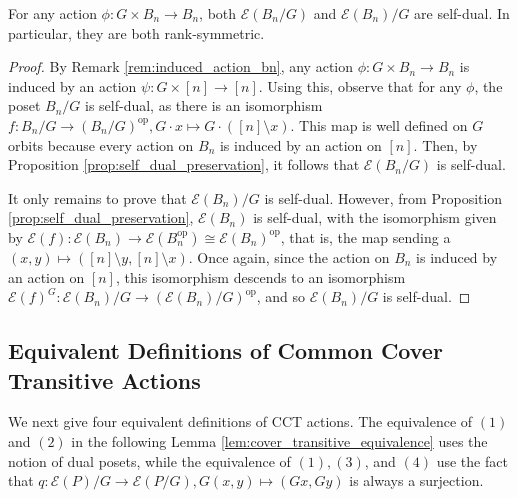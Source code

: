 \documentclass[smallextended, envcountsame, numbook]{svjour3}
\numberwithin{equation}{section}
\newcommand\ssec{\subsection}
\newcommand\op{\operatorname{op}}
\begin{document}
\begin{corollary}
\label{cor:duality_bn_quotients}
For any action $\phi\colon G \times B_n \rightarrow B_n$, both $\mathcal E(B_n/G)$ and $\mathcal E(B_n)/G$ are self-dual. In particular, they are both rank-symmetric. 
\end{corollary}
\begin{proof}
By Remark \ref{rem:induced_action_bn}, any action $\phi\colon G\times B_n \rightarrow B_n$ is induced by an action $\psi\colon G \times [n] \rightarrow [n]$. Using this, observe that for any $\phi$, the poset $B_n/G$ is self-dual, as there is an isomorphism $f\colon B_n/G \rightarrow (B_n/G)^{\op},G \cdot x \mapsto G \cdot ([n] \setminus x)$. This map is well defined on $G$ orbits because every action on $B_n$ is induced by an action on $[n]$. Then, by Proposition \ref{prop:self_dual_preservation}, it follows that $\mathcal E(B_n/G)$ is self-dual.

It only remains to prove that $\mathcal E(B_n)/G$ is self-dual. However, from Proposition \ref{prop:self_dual_preservation}, $\mathcal E(B_n)$ is self-dual, with the isomorphism given by $\mathcal E(f)\colon\mathcal E(B_n) \rightarrow \mathcal E(B_n^{\op})\cong \mathcal E(B_n)^{\op}$, that is, the map sending a $(x,y) \mapsto ([n]\setminus y,[n] \setminus x)$. Once again, since the action on $B_n$ is induced by an action on $[n]$, this isomorphism descends to an isomorphism $\mathcal E(f)^G\colon\mathcal E(B_n)/G \rightarrow  (\mathcal{E}(B_n)/G)^{\op}$, and so $\mathcal E(B_n)/G$ is self-dual.
\end{proof}

\ssec{Equivalent Definitions of Common Cover Transitive Actions}
\label{ssec:equivalent_defs}

We next give four equivalent definitions of CCT actions. The equivalence of $(1)$ and $(2)$ in the following Lemma \ref{lem:cover_transitive_equivalence} uses the notion of dual posets, while the equivalence of $(1),(3)$, and $(4)$ use the fact that $q\colon\mathcal E(P)/G \rightarrow \mathcal E(P/G),G(x,y)\mapsto (Gx,Gy)$ is always a surjection.
\end{document}
